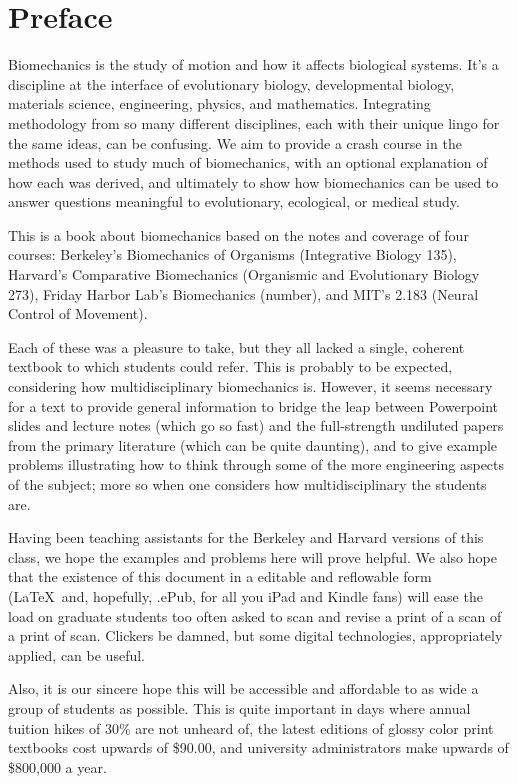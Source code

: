 \chapter*{Preface}

Biomechanics is the study of motion and how it affects biological systems. It's a discipline at the interface of evolutionary biology, developmental biology, materials science, engineering, physics, and mathematics. Integrating methodology from so many different disciplines, each with their unique lingo for the same ideas, can be confusing. We aim to provide a crash course in the methods used to study much of biomechanics, with an optional explanation of how each was derived, and ultimately to show how biomechanics can be used to answer questions meaningful to evolutionary, ecological, or medical study.

This is a book about biomechanics based on the notes and coverage of four courses:  Berkeley's Biomechanics of Organisms (Integrative Biology 135), Harvard's Comparative Biomechanics (Organismic and Evolutionary Biology 273), Friday Harbor Lab's Biomechanics (number), and MIT's 2.183 (Neural Control of Movement).  

Each of these was a pleasure to take, but they all lacked a single, coherent textbook to which students could refer.  This is probably to be expected, considering how multidisciplinary biomechanics is.  However, it seems necessary for a text to provide general information to bridge the leap between Powerpoint slides and lecture notes (which go so fast) and the full-strength undiluted papers from the primary literature (which can be quite daunting), and to give example problems illustrating how to think through some of the more engineering aspects of the subject; more so when one considers how multidisciplinary the students are.

Having been teaching assistants for the Berkeley and Harvard versions of this class, we hope the examples and problems here will prove helpful.  We also hope that the existence of this document in a editable and reflowable form (\LaTeX\ and, hopefully, .ePub, for all you iPad and Kindle fans) will ease the load on graduate students too often asked to scan and revise a print of a scan of a print of scan.  Clickers be damned, but some digital technologies, appropriately applied, can be useful.

Also, it is our sincere hope this will be accessible and affordable to as wide a group of students as possible.  This is quite important in days where annual tuition hikes of 30\% are not unheard of, the latest editions of glossy color print textbooks cost upwards of \$90.00, and university administrators make upwards of \$800,000 a year. 

